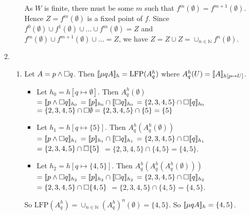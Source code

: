 \documentclass[a4paper, draft, 12pt]{article}
\begin{document}
\begin{enumerate}
\begin{enumerate}
\begin{enumerate}
  As $W$ is finite, there must be some $m$ such that $f^m(\emptyset) = f^{m+1}(\emptyset)$. 
  Hence $Z = f^m(\emptyset)$ is a fixed point of $f$. 
  Since $f^0(\emptyset) \cup f^1(\emptyset) \cup ... \cup f^m(\emptyset) = Z$ and 
  $f^m(\emptyset) \cup f^{m+1}(\emptyset) \cup ... = Z$, 
  we have $Z = Z \cup Z = \cup_{n \in \mathbb{N}} f^{n}(\emptyset)$.
  \end{enumerate}
  \item
  \begin{enumerate}
  \item  Let $A = p \wedge \square q$. 
  Then $\llbracket\mu q A\rrbracket_h = \text{LFP}(A^h_q)$ where $A^h_q(U) = \llbracket A\rrbracket_{h[p \mapsto U]}$.
  \begin{itemize}
  \item 
  Let $h_0 = h[q \mapsto \emptyset]$. Then $A^h_q(\emptyset)$ \\
  $ =\llbracket p \wedge \square q\rrbracket_{h_0}$ 
  $ = \llbracket p\rrbracket_{h_0} \cap \llbracket\square q\rrbracket_{h_0}$
  $ = \{2,3,4,5\} \cap \square \llbracket q\rrbracket_{h_0}$ \\
  $ = \{2,3,4,5\} \cap \square \emptyset = \{2,3,4,5\} \cap \{5\} = \{5\}$
  \item 
  Let $h_1 = h[q \mapsto \{5\}]$. Then $A^h_q(A^h_q(\emptyset))$ \\
  $ = \llbracket p \wedge \square q\rrbracket_{h_1}$ 
  $ = \llbracket p\rrbracket_{h_1} \cap \llbracket\square q\rrbracket_{h_1}$
  $ = \{2,3,4,5\} \cap \square \llbracket q\rrbracket_{h_1}$ \\
  $ = \{2,3,4,5\} \cap \square \{5\}$
  $ = \{2,3,4,5\} \cap \{4,5\} = \{4,5\}$.
  \item 
  Let $h_2 = h[q \mapsto \{4,5\}]$. Then $A^h_q(A^h_q(A^h_q(\emptyset)))$ \\
  $ = \llbracket p \wedge \square q\rrbracket_{h_2}$ 
  $ = \llbracket p\rrbracket_{h_2} \cap \llbracket\square q\rrbracket_{h_2}$
  $ = \{2,3,4,5\} \cap \square \llbracket q\rrbracket_{h_2}$ \\
  $ = \{2,3,4,5\} \cap \square \{4,5\}$
  $ = \{2,3,4,5\} \cap \{4,5\} = \{4,5\}$.
  \end{itemize}
  So $\text{LFP}(A^h_q) = \cup_{n \in \mathbb{N}} (A^h_q)^n(\emptyset) = \{4,5\}$.
  So $\llbracket\mu q A\rrbracket_h = \{4,5\}$.


\end{enumerate}
\end{enumerate}
\end{enumerate}
\end{document}

